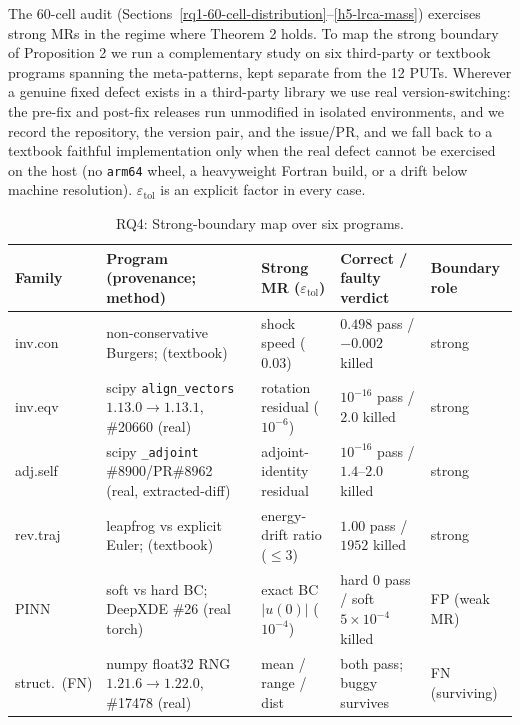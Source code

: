 \documentclass[12pt]{article}
\begin{document}
The 60-cell audit (Sections~\ref{rq1-60-cell-distribution}--\ref{h5-lrca-mass}) exercises strong MRs in the regime where
Theorem 2 holds. To map the strong boundary of Proposition 2 we run a
complementary study on six third-party or textbook programs spanning the
meta-patterns, kept separate from the 12 PUTs. Wherever a genuine fixed
defect exists in a third-party library we use real version-switching:
the pre-fix and post-fix releases run unmodified in isolated environments,
and we record the repository, the version pair, and the issue/PR, and
we fall back to a textbook faithful implementation only when the real
defect cannot be exercised on the host (no \texttt{arm64} wheel, a
heavyweight Fortran build, or a drift below machine resolution).
$\varepsilon_{\mathrm{tol}}$ is an explicit factor in every case.

{\def\LTcaptype{table} %
\begin{longtable}[]{@{}p{1.6cm}p{3.4cm}p{2.5cm}p{2.6cm}p{1.7cm}@{}}
\caption{RQ4: Strong-boundary map over six programs.}\label{tab:p2-30}\\
\toprule\noalign{}
Family & Program (provenance; method) & Strong MR ($\varepsilon_{\mathrm{tol}}$) & Correct / faulty verdict & Boundary role \\
\midrule\noalign{}
\endfirsthead
\endhead
\bottomrule\noalign{}
\endlastfoot
inv.con & non-conservative Burgers; \citep{hou1994nonconservative} (textbook) & shock speed ($0.03$) & $0.498$ pass / $-0.002$ killed & strong \\
inv.eqv & scipy \texttt{align\_vectors} $1.13.0\to1.13.1$, \#20660 (real) & rotation residual ($10^{-6}$) & $10^{-16}$ pass / $2.0$ killed & strong \\
adj.self & scipy \texttt{\_adjoint} \#8900/PR\#8962 (real, extracted-diff) & adjoint-identity residual & $10^{-16}$ pass / $1.4$--$2.0$ killed & strong \\
rev.traj & leapfrog vs explicit Euler; \citep{hairer2006geometric} (textbook) & energy-drift ratio ($\leq 3$) & $1.00$ pass / $1952$ killed & strong \\
PINN & soft vs hard BC; DeepXDE \#26 (real torch) & exact BC $|u(0)|$ ($10^{-4}$) & hard $0$ pass / soft $5\times10^{-4}$ killed & FP (weak MR) \\
struct.\ (FN) & numpy float32 RNG $1.21.6\to1.22.0$, \#17478 (real) & mean / range / dist & both pass; buggy survives & FN (surviving) \\
\end{longtable}
}
\end{document}
